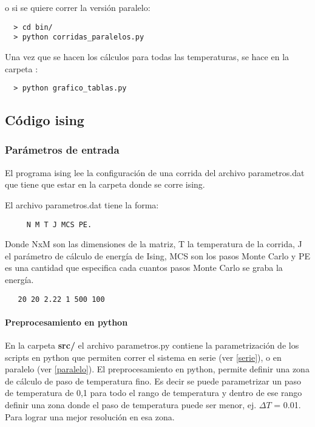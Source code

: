 o si se quiere correr la versión paralelo:

\begin{verbatim}
  > cd bin/
  > python corridas_paralelos.py
\end{verbatim}


Una vez que se hacen los cálculos para todas las temperaturas, se hace en 
la carpeta :

\begin{verbatim}
  > python grafico_tablas.py 
\end{verbatim}




\subsection{C\'odigo ising}

\subsubsection{Par\'ametros de entrada}

El programa ising lee la configuraci\'on de una corrida del 
archivo parametros.dat que tiene que estar en la carpeta donde se
corre ising.

El archivo parametros.dat tiene la forma: 

\begin{verbatim}
     N M T J MCS PE. 
\end{verbatim}

Donde NxM 
son las dimensiones de la matriz, T la temperatura de la corrida,
J el par\'ametro de c\'alculo de energ\'ia de Ising, MCS son los pasos Monte Carlo y PE
es una cantidad que especifica cada cuantos pasos Monte Carlo se graba la energ\'ia.

\begin{verbatim}
   20 20 2.22 1 500 100
\end{verbatim}


\paragraph{Preprocesamiento en python}
En la carpeta \textbf{src/} el archivo parametros.py contiene la parametrizaci\'on 
de los scripts
en python que permiten correr el sistema en serie (ver \ref{serie}), 
o en paralelo (ver \ref{paralelo}).
El preprocesamiento en python, permite definir una zona de c\'alculo de paso
de temperatura fino. Es decir se puede parametrizar un paso de temperatura de
0,1 para todo el rango de temperatura y dentro de ese rango definir una zona
donde el paso de temperatura puede ser menor, ej. $\Delta T$ = 0.01. Para lograr una mejor resoluci\'on
en esa zona.

